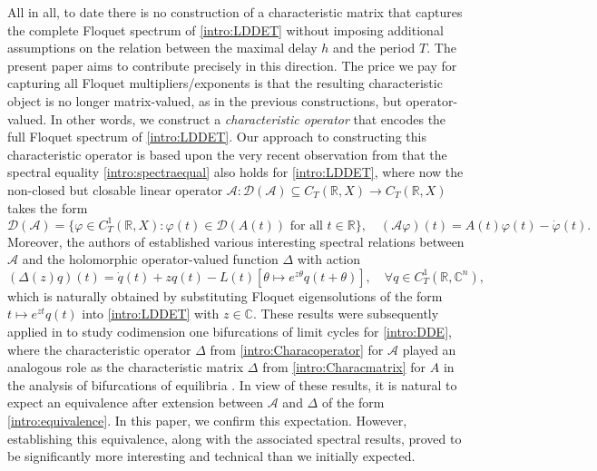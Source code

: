 \documentclass[english]{myarticle}
\begin{document}
\begin{sloppypar}
All in all, to date there is no construction of a characteristic matrix that captures the complete Floquet spectrum of \eqref{intro:LDDET} without imposing additional assumptions on the relation between the maximal delay $h$ and the period $T$. The present paper aims to contribute precisely in this direction. The price we pay for capturing all Floquet multipliers/exponents is that the resulting characteristic object is no longer matrix-valued, as in the previous constructions, but operator-valued. In other words, we construct a \emph{characteristic operator} that encodes the full Floquet spectrum of \eqref{intro:LDDET}. Our approach to constructing this characteristic operator is based upon the very recent observation from \cite{Bosschaert2025,Lentjes2026} that the spectral equality \eqref{intro:spectraequal} also holds for \eqref{intro:LDDET}, where now the non-closed but closable linear operator $\mathcal{A} : \mathcal{D}(\mathcal{A}) \subseteq C_T(\mathbb{R},X) \to C_T(\mathbb{R},X)$ takes the form
\begin{equation} \label{eq:introcurlyA}
    \mathcal{D}(\mathcal{A}) = \{\varphi \in C_T^1(\mathbb{R},X) : \varphi(t) \in \mathcal{D}(A(t)) \mbox{ for all } t \in \mathbb{R} \}, \quad (\mathcal{A}\varphi)(t) = A(t)\varphi(t) - \dot{\varphi}(t).
\end{equation}
Moreover, the authors of \cite{Bosschaert2025,Lentjes2026} established various interesting spectral relations between $\mathcal{A}$ and the holomorphic operator-valued function $\Delta$ with action
\begin{equation} \label{intro:Characoperator}
    (\Delta(z)q)(t) = \dot{q}(t) + zq(t) - L(t)[\theta \mapsto e^{z \theta}q(t+\theta)], \quad \forall q \in C_T^1(\mathbb{R},\mathbb{C}^n),
\end{equation}
which is naturally obtained by substituting Floquet eigensolutions of the form $t \mapsto e^{zt}q(t)$ into \eqref{intro:LDDET} with $z \in \mathbb{C}$. These results were subsequently applied in \cite{Bosschaert2025} to study codimension one bifurcations of limit cycles for \eqref{intro:DDE}, where the characteristic operator $\Delta$ from \eqref{intro:Characoperator} for $\mathcal{A}$ played an analogous role as the characteristic matrix $\Delta$ from \eqref{intro:Characmatrix} for $A$ in the analysis of bifurcations of equilibria \cite{Bosschaert2020}. In view of these results, it is natural to expect an equivalence after extension between $\mathcal{A}$ and $\Delta$ of the form \eqref{intro:equivalence}. In this paper, we confirm this expectation. However, establishing this equivalence, along with the associated spectral results, proved to be significantly more interesting and technical than we initially expected.


\end{sloppypar}
\end{document}
